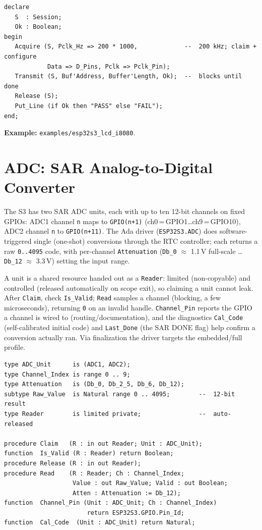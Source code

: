 \begin{lstlisting}
declare
   S  : Session;
   Ok : Boolean;
begin
   Acquire (S, Pclk_Hz => 200 * 1000,             --  200 kHz; claim + configure
            Data => D_Pins, Pclk => Pclk_Pin);
   Transmit (S, Buf'Address, Buffer'Length, Ok);  --  blocks until done
   Release (S);
   Put_Line (if Ok then "PASS" else "FAIL");
end;
\end{lstlisting}

\noindent\textbf{Example:} \texttt{examples/esp32s3\_lcd\_i8080}.

\section{ADC: SAR Analog-to-Digital Converter}
\label{app:int:adc}

The S3 has two SAR ADC units, each with up to ten 12-bit channels on fixed GPIOs:
ADC1 channel \texttt{n} maps to \texttt{GPIO(n+1)} (ch0\,=\,GPIO1\ldots ch9\,=\,GPIO10),
ADC2 channel \texttt{n} to \texttt{GPIO(n+11)}. The Ada driver
(\texttt{ESP32S3.ADC}) does software-triggered single (one-shot) conversions
through the RTC controller; each returns a raw \texttt{0..4095} code, with
per-channel \texttt{Attenuation} (\texttt{Db\_0} $\approx$ 1.1\,V full-scale
\ldots \texttt{Db\_12} $\approx$ 3.3\,V) setting the input range.

A unit is a shared resource handed out as a \texttt{Reader}: limited
(non-copyable) and controlled (released automatically on scope exit), so
claiming a unit cannot leak. After \texttt{Claim}, check \texttt{Is\_Valid};
\texttt{Read} samples a channel (blocking, a few microseconds), returning
\texttt{0} on an invalid handle. \texttt{Channel\_Pin} reports the GPIO a channel
is wired to (routing/documentation), and the diagnostics \texttt{Cal\_Code}
(self-calibrated initial code) and \texttt{Last\_Done} (the SAR DONE flag) help
confirm a conversion actually ran. Via finalization the driver targets the
embedded/full profile.

\begin{lstlisting}
type ADC_Unit      is (ADC1, ADC2);
type Channel_Index is range 0 .. 9;
type Attenuation   is (Db_0, Db_2_5, Db_6, Db_12);
subtype Raw_Value  is Natural range 0 .. 4095;        --  12-bit result
type Reader        is limited private;                --  auto-released

procedure Claim   (R : in out Reader; Unit : ADC_Unit);
function  Is_Valid (R : Reader) return Boolean;
procedure Release (R : in out Reader);
procedure Read    (R : Reader; Ch : Channel_Index;
                   Value : out Raw_Value; Valid : out Boolean;
                   Atten : Attenuation := Db_12);
function  Channel_Pin (Unit : ADC_Unit; Ch : Channel_Index)
                       return ESP32S3.GPIO.Pin_Id;
function  Cal_Code  (Unit : ADC_Unit) return Natural;
\end{lstlisting}


